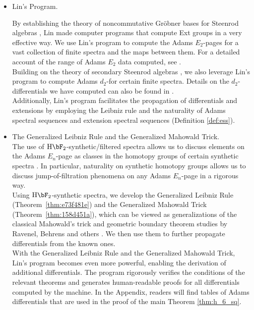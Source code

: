\documentclass{amsart}
\numberwithin{equation}{section}
\newcommand{\HF}{\mathrm{H}\bF_2}
\begin{document}
\begin{itemize}
    \item Lin's Program.

    \noindent By establishing the theory of noncommutative Gr\"obner bases for Steenrod algebras \cite{LinGrobner}, Lin made computer programs that compute Ext groups in a very effective way. We use Lin's program to compute the Adams $E_2$-pages for a vast collection of finite spectra and the maps between them. For a detailed account of the range of Adams $E_2$ data computed, see \cite{LWXMachine}.\\
    
    \noindent Building on the theory of secondary Steenrod algebras \cite{BJ, Nassau, Chua}, we also leverage Lin’s program to compute Adams $d_2$-for certain finite spectra. Details on the $d_2$-differentials we have computed can also be found in \cite{LWXMachine}.\\
    
    \noindent Additionally, Lin’s program facilitates the propagation of differentials and extensions by employing the Leibniz rule and the naturality of Adams spectral sequences and extension spectral sequences (Definition \ref{def:ess}). \\

    \item The Generalized Leibniz Rule and the Generalized Mahowald Trick. \\

    \noindent The use of $\HF$-synthetic/filtered spectra allows us to discuss elements on the Adams $E_n$-page as classes in the homotopy groups of certain synthetic spectra \cite{Pst, BurklundXu}. In particular, naturality on synthetic homotopy groups allows us to discuss jump-of-filtration phenomena on any Adams $E_n$-page in a rigorous way. \\
    
    \noindent Using $\HF$-synthetic spectra, we develop the Generalized Leibniz Rule (Theorem~\ref{thm:e73f481e}) and the Generalized Mahowald Trick (Theorem~\ref{thm:158d451a}), which can be viewed as generalizations of the classical Mahowald's trick and geometric boundary theorem studies by Ravenel, Behrens and others \cite{RavenelGreenbook, Behrens, Ma, BurklundCookware}. We then use them to further propagate differentials from the known ones.\\

    \noindent With the Generalized Leibniz Rule and the Generalized Mahowald Trick, Lin’s program becomes even more powerful, enabling the derivation of additional differentials. The program rigorously verifies the conditions of the relevant theorems and generates human-readable proofs \cite{LWXZenodo} for all differentials computed by the machine. In the Appendix, readers will find tables of Adams differentials that are used in the proof of the main Theorem \ref{thm:h_6_sq}.\\


\end{itemize}
\end{document}
